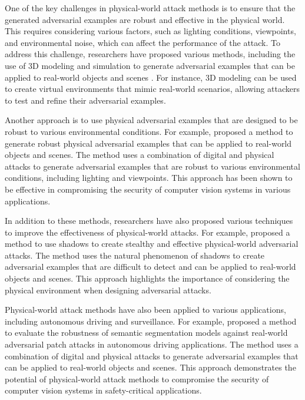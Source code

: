 \documentclass[11pt]{article}
\begin{document}
One of the key challenges in physical-world attack methods is to ensure that the generated adversarial examples are robust and effective in the physical world. This requires considering various factors, such as lighting conditions, viewpoints, and environmental noise, which can affect the performance of the attack. To address this challenge, researchers have proposed various methods, including the use of 3D modeling and simulation to generate adversarial examples that can be applied to real-world objects and scenes \cite{ref72}. For instance, 3D modeling can be used to create virtual environments that mimic real-world scenarios, allowing attackers to test and refine their adversarial examples.

Another approach is to use physical adversarial examples that are designed to be robust to various environmental conditions. For example, \cite{ref73} proposed a method to generate robust physical adversarial examples that can be applied to real-world objects and scenes. The method uses a combination of digital and physical attacks to generate adversarial examples that are robust to various environmental conditions, including lighting and viewpoints. This approach has been shown to be effective in compromising the security of computer vision systems in various applications.

In addition to these methods, researchers have also proposed various techniques to improve the effectiveness of physical-world attacks. For example, \cite{ref74} proposed a method to use shadows to create stealthy and effective physical-world adversarial attacks. The method uses the natural phenomenon of shadows to create adversarial examples that are difficult to detect and can be applied to real-world objects and scenes. This approach highlights the importance of considering the physical environment when designing adversarial attacks.

Physical-world attack methods have also been applied to various applications, including autonomous driving and surveillance. For example, \cite{ref75} proposed a method to evaluate the robustness of semantic segmentation models against real-world adversarial patch attacks in autonomous driving applications. The method uses a combination of digital and physical attacks to generate adversarial examples that can be applied to real-world objects and scenes. This approach demonstrates the potential of physical-world attack methods to compromise the security of computer vision systems in safety-critical applications.
\end{document}

